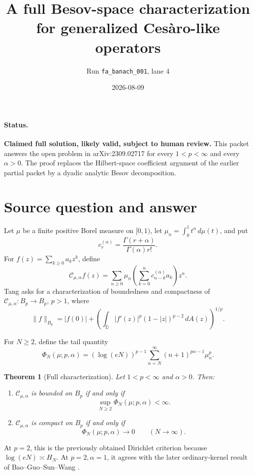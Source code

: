 \documentclass[11pt]{article}
\title{A full Besov-space characterization for generalized Ces\`aro-like operators}
\author{Run \texttt{fa\_banach\_001}, lane 4}
\date{2026-08-09}
\newtheorem{theorem}{Theorem}
\newcommand{\D}{\mathbb D}
\newcommand{\Cma}{\mathcal C_{\mu,\alpha}}
\begin{document}
\maketitle

\paragraph{Status.}
\textbf{Claimed full solution, likely valid, subject to human review.}
This packet answers the open problem in arXiv:2309.02717 for every
\(1<p<\infty\) and every \(\alpha>0\).  The proof replaces the Hilbert-space
coefficient argument of the earlier partial packet by a dyadic analytic
Besov decomposition.

\section{Source question and answer}

Let \(\mu\) be a finite positive Borel measure on \([0,1)\), let
\(\mu_n=\int_0^1t^n\,d\mu(t)\), and put
\[
 c_r^{(\alpha)}=\frac{\Gamma(r+\alpha)}{\Gamma(\alpha)r!}.
\]
For \(f(z)=\sum_{k\geq0}a_kz^k\), define
\[
 \Cma f(z)=\sum_{n\geq0}\mu_n
 \left(\sum_{k=0}^n c_{n-k}^{(\alpha)}a_k\right)z^n.
\]
Tang \cite{Tang} asks for a characterization of boundedness and compactness
of \(\Cma:B_p\to B_p\), \(p>1\), where
\[
 \|f\|_{B_p}=|f(0)|+
 \left(\int_{\D}|f'(z)|^p(1-|z|)^{p-2}\,dA(z)\right)^{1/p}.
\]

For \(N\geq2\), define the tail quantity
\begin{equation}\label{eq:Phi}
 \Phi_N(\mu;p,\alpha)=
 (\log(eN))^{p-1}
 \sum_{n=N}^{\infty}(n+1)^{p\alpha-1}\mu_n^p.
\end{equation}

\begin{theorem}[Full characterization]\label{thm:main}
Let \(1<p<\infty\) and \(\alpha>0\).  Then:
\begin{enumerate}
\item \(\Cma\) is bounded on \(B_p\) if and only if
\[
 \sup_{N\geq2}\Phi_N(\mu;p,\alpha)<\infty.
\]
\item \(\Cma\) is compact on \(B_p\) if and only if
\[
 \Phi_N(\mu;p,\alpha)\longrightarrow0
 \qquad(N\to\infty).
\]
\end{enumerate}
\end{theorem}

At \(p=2\), this is the previously obtained Dirichlet criterion because
\(\log(eN)\asymp H_N\).  At \(p=2,\alpha=1\), it agrees with the later
ordinary-kernel result of Bao--Guo--Sun--Wang \cite{BGSW}.
\end{document}
